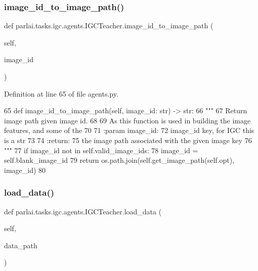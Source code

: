 \subsubsection{\texorpdfstring{image\+\_\+id\+\_\+to\+\_\+image\+\_\+path()}{image\_id\_to\_image\_path()}}
{\footnotesize\ttfamily def parlai.\+tasks.\+igc.\+agents.\+I\+G\+C\+Teacher.\+image\+\_\+id\+\_\+to\+\_\+image\+\_\+path (\begin{DoxyParamCaption}\item[{}]{self,  }\item[{}]{image\+\_\+id }\end{DoxyParamCaption})}



Definition at line 65 of file agents.\+py.


\begin{DoxyCode}
65     \textcolor{keyword}{def }image\_id\_to\_image\_path(self, image\_id: str) -> str:
66         \textcolor{stringliteral}{"""}
67 \textcolor{stringliteral}{        Return image path given image id.}
68 \textcolor{stringliteral}{}
69 \textcolor{stringliteral}{        As this function is used in building the image features, and some of the}
70 \textcolor{stringliteral}{}
71 \textcolor{stringliteral}{        :param image\_id:}
72 \textcolor{stringliteral}{            image\_id key, for IGC this is a str}
73 \textcolor{stringliteral}{}
74 \textcolor{stringliteral}{        :return:}
75 \textcolor{stringliteral}{            the image path associated with the given image key}
76 \textcolor{stringliteral}{        """}
77         \textcolor{keywordflow}{if} image\_id \textcolor{keywordflow}{not} \textcolor{keywordflow}{in} self.valid\_image\_ids:
78             image\_id = self.blank\_image\_id
79         \textcolor{keywordflow}{return} os.path.join(self.get\_image\_path(self.opt), image\_id)
80 
\end{DoxyCode}
\mbox{\label{classparlai_1_1tasks_1_1igc_1_1agents_1_1IGCTeacher_acf14f2bf20b4954bb44b77d8feaadaea}} 
\subsubsection{\texorpdfstring{load\+\_\+data()}{load\_data()}}
{\footnotesize\ttfamily def parlai.\+tasks.\+igc.\+agents.\+I\+G\+C\+Teacher.\+load\+\_\+data (\begin{DoxyParamCaption}\item[{}]{self,  }\item[{}]{data\+\_\+path }\end{DoxyParamCaption})}



